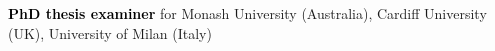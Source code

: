 
%




\vspace{0.2cm}
\textbf{\textcolor{black}{PhD thesis examiner}} for Monash University (Australia),  Cardiff University (UK), University of Milan (Italy) \vspace{-0.1cm}

